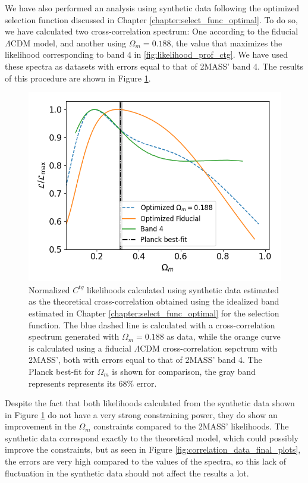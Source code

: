 \documentclass[openany,a4paper,12pt,oneside]{book}
\begin{document}
\begin{spacing}{1.5}
We have also performed an analysis using synthetic data following the optimized selection function discussed in Chapter \ref{chapter:select_func_optimal}. To do so, we have calculated two cross-correlation spectrum: One according to the fiducial $\Lambda$CDM model, and another using $\Omega_m=0.188$, the value that maximizes the likelihood corresponding to band 4 in \ref{fig:likelihood_prof_ctg}. We have used these spectra as datasets with errors equal to that of 2MASS' band 4. The results of this procedure are shown in Figure \ref{fig:likelihood_band_optimal}.

\begin{figure}[!htb]
	\centering
	\includegraphics[width=.7\linewidth]{Imagens/profile_BestBand.png}
	\caption{Normalized $C^{tg}$ likelihoods calculated using synthetic data estimated as the theoretical cross-correlation obtained using the idealized band estimated in Chapter \ref{chapter:select_func_optimal} for the selection function. The blue dashed line is calculated with a cross-correlation spectrum generated with $\Omega_m=0.188$ as data, while the orange curve is calculated using a fiducial $\Lambda$CDM cross-correlation sepctrum with 2MASS', both with errors equal to that of 2MASS' band 4. The Planck best-fit for $\Omega_m$ is shown for comparison, the gray band represents represents its 68\% error.}
	\label{fig:likelihood_band_optimal}
\end{figure}

Despite the fact that both likelihoods calculated from the synthetic data shown in Figure \ref{fig:likelihood_band_optimal} do not have a very strong constraining power, they do show an improvement in the $\Omega_m$ constraints compared to the 2MASS' likelihoods. The synthetic data correspond exactly to the theoretical model, which could possibly improve the constraints, but as seen in Figure \ref{fig:correlation_data_final_plots}, the errors are very high compared to the values of the spectra, so this lack of fluctuation in the synthetic data should not affect the results a lot.


\end{spacing}
\end{document}
